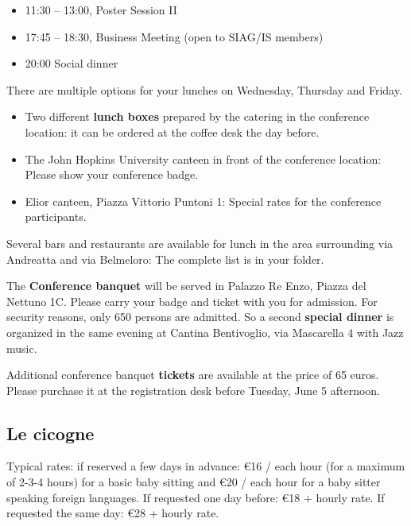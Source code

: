 \begin{itemize}
  \item[] 11:30 -- 13:00, Poster Session II
  \item[] 17:45 -- 18:30, Business Meeting (open to SIAG/IS members)
  \item[] 20:00 Social dinner
\end{itemize}

\newpage %
There are multiple options for your lunches on Wednesday, Thursday and Friday. 
\bigskip
\begin{itemize}
  \item Two different \textbf{lunch boxes} prepared by the catering in the conference location: it can be ordered at the coffee desk the day before.
  \item The John Hopkins University canteen in front of the conference location: Please show your conference badge.
  \item Elior canteen, Piazza Vittorio Puntoni 1: Special rates for the conference participants.
\end{itemize}
\bigskip
Several bars and restaurants are available for lunch in the area surrounding via Andreatta and via Belmeloro: The complete list is in your folder.

The \textbf{Conference banquet} will be served in Palazzo Re Enzo, Piazza del Nettuno 1C. Please carry your badge and ticket with you for admission. For security
reasons, only 650 persons are admitted. So a second \textbf{special dinner} is organized in the same evening at Cantina Bentivoglio, via Mascarella 4 with 
Jazz music.

\bigskip 

\noindent Additional conference banquet \textbf{tickets} are available at the price of 65 euros. 
Please purchase it at the registration desk before Tuesday, June 5 afternoon.\\

\subsection*{Le cicogne} 
Typical rates: if reserved a few days in advance: \euro 16 / each hour (for a maximum of 2-3-4 hours) for a basic baby sitting 
and \euro 20 / each hour for a baby sitter speaking foreign languages.
If requested one day before: \euro 18 + hourly rate.
If requested the same day: \euro 28 + hourly rate.

